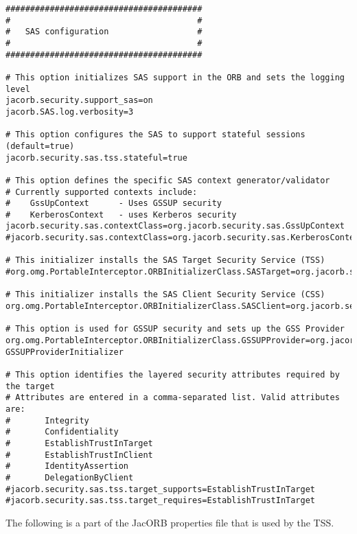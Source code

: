 \begin{scriptsize}
\begin{verbatim}
########################################
#                                      #
#   SAS configuration                  #
#                                      #
########################################

# This option initializes SAS support in the ORB and sets the logging level
jacorb.security.support_sas=on
jacorb.SAS.log.verbosity=3

# This option configures the SAS to support stateful sessions (default=true)
jacorb.security.sas.tss.stateful=true

# This option defines the specific SAS context generator/validator
# Currently supported contexts include:
#    GssUpContext      - Uses GSSUP security
#    KerberosContext   - uses Kerberos security
jacorb.security.sas.contextClass=org.jacorb.security.sas.GssUpContext
#jacorb.security.sas.contextClass=org.jacorb.security.sas.KerberosContext

# This initializer installs the SAS Target Security Service (TSS)
#org.omg.PortableInterceptor.ORBInitializerClass.SASTarget=org.jacorb.security.sas.SASTargetInitializer

# This initializer installs the SAS Client Security Service (CSS)
org.omg.PortableInterceptor.ORBInitializerClass.SASClient=org.jacorb.security.sas.SASClientInitializer

# This option is used for GSSUP security and sets up the GSS Provider
org.omg.PortableInterceptor.ORBInitializerClass.GSSUPProvider=org.jacorb.security.sas.
GSSUPProviderInitializer

# This option identifies the layered security attributes required by the target
# Attributes are entered in a comma-separated list. Valid attributes are:
#       Integrity
#       Confidentiality
#       EstablishTrustInTarget
#       EstablishTrustInClient
#       IdentityAssertion
#       DelegationByClient
#jacorb.security.sas.tss.target_supports=EstablishTrustInTarget
#jacorb.security.sas.tss.target_requires=EstablishTrustInTarget
\end{verbatim}
\end{scriptsize}


The following is a part of the JacORB properties file that is used by 
the TSS.

